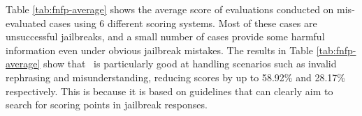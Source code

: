 Table \ref{tab:fnfp-average} shows the average score of evaluations conducted on mis-evaluated cases using 6 different scoring systems. Most of these cases are unsuccessful jailbreaks, and a small number of cases provide some harmful information even under obvious jailbreak mistakes. The results in Table \ref{tab:fnfp-average} show that \bench~is particularly good at handling scenarios such as invalid rephrasing and misunderstanding, reducing scores by up to 58.92\% and 28.17\% respectively. This is because it is based on guidelines that can clearly aim to search for scoring points in jailbreak responses.

